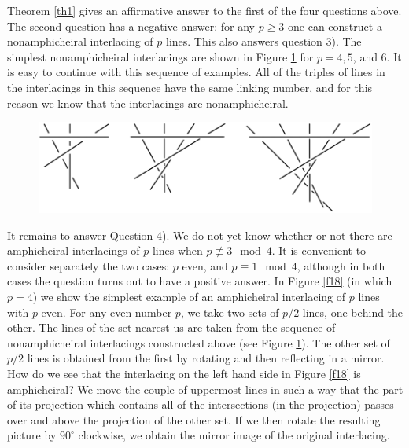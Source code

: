 \documentclass{article}
\begin{document}
Theorem \ref{th1} gives an affirmative answer to the first of the four questions above.
The second question has a negative answer: for any $p\ge3$ one can construct a
nonamphicheiral interlacing of $p$ lines. This also answers question 3). The simplest
nonamphicheiral interlacings are shown in Figure \ref{f16} for $p=4,5$, 
and 6. It is easy
to continue with this sequence of examples. All of the triples of lines in the
interlacings in this sequence have the same linking number, and for this
reason we know that the interlacings are nonamphicheiral.

\begin{figure}
{\includegraphics{imagesSkewlines/x16.png}}
\caption{}
\label{f16}
\end{figure}


It remains to answer Question 4). We do not yet know whether or not 
there are
amphicheiral interlacings of $p$ lines when $p\not\equiv 3\mod4$. It is
convenient to consider separately the two cases: $p$ even, and $p\equiv1
\mod4$, although in both cases the question turns out to have a
positive answer. In Figure \ref{f18} (in which $p=4$) we show the 
simplest example of
an amphicheiral interlacing of $p$ lines with $p$ even. For any even 
number $p$, we
take two sets of $p/2$ lines, one behind the other. The lines of the set
nearest us are taken from the sequence of nonamphicheiral interlacings constructed
above (see Figure \ref{f16}). The other set of $p/2$ lines is obtained 
from the first
by rotating and then reflecting in a mirror. How do we see that the
interlacing on the left hand side 
in Figure \ref{f18} is amphicheiral? We move the couple of uppermost 
lines in
such a way that the part of its projection which contains all of the
intersections (in the projection) passes over and above the projection of the
other set. If we then rotate the resulting picture by 
$90^\circ$ clockwise, we obtain the mirror image of the original interlacing.
\end{document}
